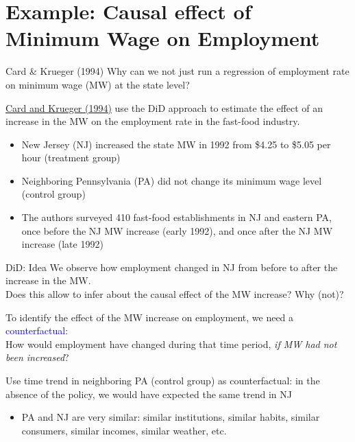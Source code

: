 \documentclass[11pt, aspectratio = 169]{beamer}
\begin{document}
\section{Example:  Causal effect of Minimum Wage on Employment}

\begin{frame}{Card \& Krueger (1994)}
Why can we not just run a regression of employment rate on minimum wage (MW) at the state level? %

\pause

\hyperlink{https://davidcard.berkeley.edu/papers/njmin-aer.pdf}{Card and Krueger (1994)} use the DiD approach to estimate the effect of an increase in the MW on the employment rate in the fast-food industry. 

\begin{itemize}
    \item New Jersey (NJ) increased the state MW in 1992 from \$4.25 to \$5.05 per hour \alert{(treatment group)}
    \item Neighboring Pennsylvania (PA) did not change its minimum wage level \\
    \alert{(control group)}
    \item The authors surveyed 410 fast-food establishments in NJ and eastern PA, once  \alert{before} the NJ MW increase (early 1992), and once \alert{after} the NJ MW increase (late 1992)
\end{itemize}
\end{frame}

\begin{frame}{DiD: Idea}
We observe how employment changed in NJ from before to after the increase in the MW. \\
 Does this allow to infer about the causal effect of the MW increase? Why (not)?

 
\pause
To identify the effect of the MW increase on employment, we need a \textcolor{blue}{counterfactual}: \\
How would employment have changed during that time period, \textit{if MW had \textit{not} been increased}?

\pause 


Use time trend in neighboring PA (control group) as counterfactual: in the absence of the policy, we would have expected the same trend in NJ

\begin{itemize}
    \item PA and NJ are very
similar: similar institutions, similar habits, similar consumers, similar incomes, similar weather, etc.
\end{itemize}
\end{frame}
\end{document}
